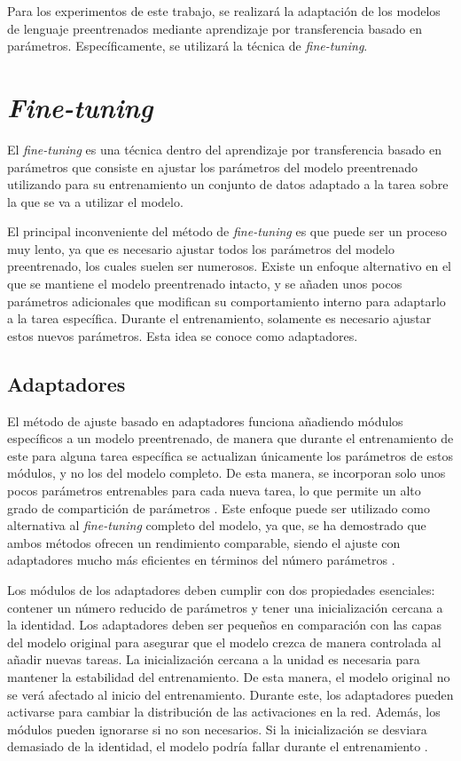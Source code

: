 \documentclass[11pt,spanish,listoffigures,listoftables]{tfgetsinf}
\begin{document}
Para los experimentos de este trabajo, se realizará la adaptación de los modelos de lenguaje preentrenados mediante aprendizaje por transferencia basado en parámetros. Específicamente, se utilizará la técnica de \textit{fine-tuning}.

\section{\textit{Fine-tuning}}

El \textit{fine-tuning} es una técnica dentro del aprendizaje por transferencia basado en parámetros que consiste en ajustar los parámetros del modelo preentrenado utilizando para su entrenamiento un conjunto de datos adaptado a la tarea sobre la que se va a utilizar el modelo.

El principal inconveniente del método de \textit{fine-tuning} es que puede ser un proceso muy lento, ya que es necesario ajustar todos los parámetros del modelo preentrenado, los cuales suelen ser numerosos. Existe un enfoque alternativo en el que se mantiene el modelo preentrenado intacto, y se añaden unos pocos parámetros adicionales que modifican su comportamiento interno para adaptarlo a la tarea específica. Durante el entrenamiento, solamente es necesario ajustar estos nuevos parámetros. Esta idea se conoce como adaptadores.

\subsection{Adaptadores}

El método de ajuste basado en adaptadores funciona añadiendo módulos específicos a un modelo preentrenado, de manera que durante el entrenamiento de este para alguna tarea específica se actualizan únicamente los parámetros de estos módulos, y no los del modelo completo. De esta manera, se incorporan solo unos pocos parámetros entrenables para cada nueva tarea, lo que permite un alto grado de compartición de parámetros \cite{he2021effectivenessadapterbasedtuningpretrained}. Este enfoque puede ser utilizado como alternativa al \textit{fine-tuning} completo del modelo, ya que, se ha demostrado que ambos métodos ofrecen un rendimiento comparable, siendo el ajuste con adaptadores mucho más eficientes en términos del número parámetros \cite{houlsby2019parameterefficienttransferlearningnlp, stickland2019bertpalsprojectedattention}.

Los módulos de los adaptadores deben cumplir con dos propiedades esenciales: contener un número reducido de parámetros y tener una inicialización cercana a la identidad. Los adaptadores deben ser pequeños en comparación con las capas del modelo original para asegurar que el modelo crezca de manera controlada al añadir nuevas tareas. La inicialización cercana a la unidad es necesaria para mantener la estabilidad del entrenamiento. De esta manera, el modelo original no se verá afectado al inicio del entrenamiento. Durante este, los adaptadores pueden activarse para cambiar la distribución de las activaciones en la red. Además, los módulos pueden ignorarse si no son necesarios. Si la inicialización se desviara demasiado de la identidad, el modelo podría fallar durante el entrenamiento \cite{houlsby2019parameterefficienttransferlearningnlp}.
\end{document}
